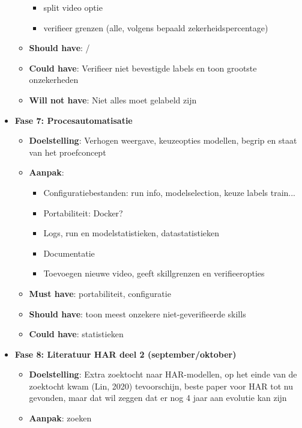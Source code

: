 \begin{itemize}
\begin{itemize}
        \begin{itemize}
            \item split video optie
            \item verifieer grenzen (alle, volgens bepaald zekerheidspercentage)
        \end{itemize}
        \item \textbf{Should have}: /
        \item \textbf{Could have}: Verifieer niet bevestigde labels en toon grootste onzekerheden
        \item \textbf{Will not have}: Niet alles moet gelabeld zijn
    \end{itemize}
    \item \textbf{Fase 7: Procesautomatisatie}
    \begin{itemize}
        \item \textbf{Doelstelling}: Verhogen weergave, keuzeopties modellen, begrip en staat van het proefconcept
        \item \textbf{Aanpak}:
        \begin{itemize}
            \item Configuratiebestanden: run info, modelselection, keuze labels train...
            \item Portabiliteit: Docker?
            \item Logs, run en modelstatistieken, datastatistieken
            \item Documentatie
            \item Toevoegen nieuwe video, geeft skillgrenzen en verifieeropties
        \end{itemize}
        \item \textbf{Must have}: portabiliteit, configuratie
        \item \textbf{Should have}: toon meest onzekere niet-geverifieerde skills
        \item \textbf{Could have}: statistieken
    \end{itemize}
    \item \textbf{Fase 8: Literatuur HAR deel 2 (september/oktober)}
    \begin{itemize}
        \item \textbf{Doelstelling}: Extra zoektocht naar HAR-modellen, op het einde van de zoektocht kwam (Lin, 2020) tevoorschijn, beste paper voor HAR tot nu gevonden, maar dat wil zeggen dat er nog 4 jaar aan evolutie kan zijn
        \item \textbf{Aanpak}: zoeken

\end{itemize}
\end{itemize}
